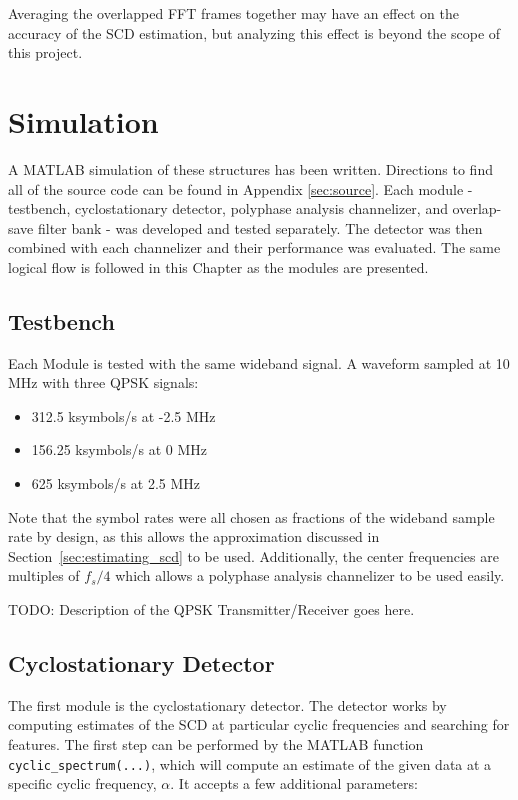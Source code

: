 \documentclass[12pt]{report}
\begin{document}
Averaging the overlapped FFT frames together may have an effect on the accuracy
of the SCD estimation, but analyzing this effect is beyond the scope of this
project.

\chapter{Simulation}
\label{sec:sim}
A MATLAB simulation of these structures has been written. Directions to find
all of the source code can be found in Appendix \ref{sec:source}. Each module
- testbench, cyclostationary detector, polyphase analysis channelizer, and
overlap-save filter bank - was developed and tested separately. The detector
was then combined with each channelizer and their performance was evaluated.
The same logical flow is followed in this Chapter as the modules are presented.

\section{Testbench}
Each Module is tested with the same wideband signal. A waveform sampled at 10 MHz with three QPSK signals:
\begin{itemize}
    \item{312.5 ksymbols/s at -2.5 MHz}
    \item{156.25 ksymbols/s at 0 MHz}
    \item{625 ksymbols/s at 2.5 MHz}
\end{itemize}
Note that the symbol rates were all chosen as fractions of the wideband sample
rate by design, as this allows the approximation discussed in
Section~\ref{sec:estimating_scd} to be used. Additionally, the center
frequencies are multiples of $f_s/4$ which allows a polyphase analysis
channelizer to be used easily.

TODO: Description of the QPSK Transmitter/Receiver goes here.

\section{Cyclostationary Detector}
\label{sec:sim_cyclo}
The first module is the cyclostationary detector. The detector works by
computing estimates of the SCD at particular cyclic frequencies and searching
for features. The first step can be performed by the MATLAB function
\texttt{cyclic\_spectrum(...)}, which will compute an estimate of the given
data at a specific cyclic frequency, $\alpha$.  It accepts a few additional
parameters:
\end{document}
